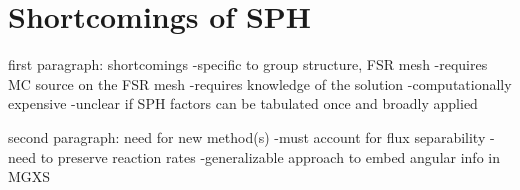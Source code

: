 

\section{Shortcomings of SPH}
\label{subsec:chap6-sph-shortcomings}

first paragraph: shortcomings
-specific to group structure, FSR mesh
-requires MC source on the FSR mesh
  -requires knowledge of the solution
-computationally expensive
-unclear if SPH factors can be tabulated once and broadly applied

second paragraph: need for new method(s)
-must account for flux separability
-need to preserve reaction rates
-generalizable approach to embed angular info in MGXS